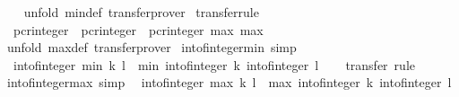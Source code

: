 \begin{isabellebody}
%
\isadelimproof
\ \ %
\endisadelimproof
%
\isatagproof
{}\isamarkupfalse%
\ {\isacharparenleft}{\kern0pt}unfold\ min{\isacharunderscore}{\kern0pt}def{\isacharparenright}{\kern0pt}\ transfer{\isacharunderscore}{\kern0pt}prover%
\endisatagproof
{\isafoldproof}%
%
\isadelimproof
\isanewline
%
\endisadelimproof
\isanewline
{}\isamarkupfalse%
\ {\isacharbrackleft}{\kern0pt}transfer{\isacharunderscore}{\kern0pt}rule{\isacharbrackright}{\kern0pt}{\isacharcolon}{\kern0pt}\isanewline
\ \ {\isacartoucheopen}{\isacharparenleft}{\kern0pt}pcr{\isacharunderscore}{\kern0pt}integer\ {\isacharequal}{\kern0pt}{\isacharequal}{\kern0pt}{\isacharequal}{\kern0pt}{\isachargreater}{\kern0pt}\ pcr{\isacharunderscore}{\kern0pt}integer\ {\isacharequal}{\kern0pt}{\isacharequal}{\kern0pt}{\isacharequal}{\kern0pt}{\isachargreater}{\kern0pt}\ pcr{\isacharunderscore}{\kern0pt}integer{\isacharparenright}{\kern0pt}\ max\ max{\isacartoucheclose}\isanewline
%
\isadelimproof
\ \ %
\endisadelimproof
%
\isatagproof
{}\isamarkupfalse%
\ {\isacharparenleft}{\kern0pt}unfold\ max{\isacharunderscore}{\kern0pt}def{\isacharparenright}{\kern0pt}\ transfer{\isacharunderscore}{\kern0pt}prover%
\endisatagproof
{\isafoldproof}%
%
\isadelimproof
\isanewline
%
\endisadelimproof
\isanewline
{}\isamarkupfalse%
\isanewline
\isanewline
{}\isamarkupfalse%
\ int{\isacharunderscore}{\kern0pt}of{\isacharunderscore}{\kern0pt}integer{\isacharunderscore}{\kern0pt}min\ {\isacharbrackleft}{\kern0pt}simp{\isacharbrackright}{\kern0pt}{\isacharcolon}{\kern0pt}\isanewline
\ \ {\isachardoublequoteopen}int{\isacharunderscore}{\kern0pt}of{\isacharunderscore}{\kern0pt}integer\ {\isacharparenleft}{\kern0pt}min\ k\ l{\isacharparenright}{\kern0pt}\ {\isacharequal}{\kern0pt}\ min\ {\isacharparenleft}{\kern0pt}int{\isacharunderscore}{\kern0pt}of{\isacharunderscore}{\kern0pt}integer\ k{\isacharparenright}{\kern0pt}\ {\isacharparenleft}{\kern0pt}int{\isacharunderscore}{\kern0pt}of{\isacharunderscore}{\kern0pt}integer\ l{\isacharparenright}{\kern0pt}{\isachardoublequoteclose}\isanewline
%
\isadelimproof
\ \ %
\endisadelimproof
%
\isatagproof
{}\isamarkupfalse%
\ transfer\ rule%
\endisatagproof
{\isafoldproof}%
%
\isadelimproof
\isanewline
%
\endisadelimproof
\isanewline
{}\isamarkupfalse%
\ int{\isacharunderscore}{\kern0pt}of{\isacharunderscore}{\kern0pt}integer{\isacharunderscore}{\kern0pt}max\ {\isacharbrackleft}{\kern0pt}simp{\isacharbrackright}{\kern0pt}{\isacharcolon}{\kern0pt}\isanewline
\ \ {\isachardoublequoteopen}int{\isacharunderscore}{\kern0pt}of{\isacharunderscore}{\kern0pt}integer\ {\isacharparenleft}{\kern0pt}max\ k\ l{\isacharparenright}{\kern0pt}\ {\isacharequal}{\kern0pt}\ max\ {\isacharparenleft}{\kern0pt}int{\isacharunderscore}{\kern0pt}of{\isacharunderscore}{\kern0pt}integer\ k{\isacharparenright}{\kern0pt}\ {\isacharparenleft}{\kern0pt}int{\isacharunderscore}{\kern0pt}of{\isacharunderscore}{\kern0pt}integer\ l{\isacharparenright}{\kern0pt}{\isachardoublequoteclose}\isanewline

\end{isabellebody}
